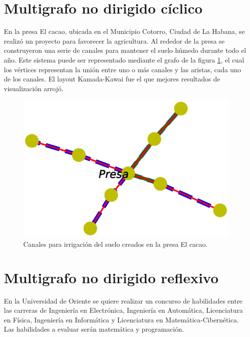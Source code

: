 \documentclass{article}
\begin{document}



\section{Multigrafo no dirigido cíclico}

En la presa El cacao, ubicada en el Municipio Cotorro, Ciudad de La Habana, se realizó un proyecto para favorecer la agricultura. Al rededor de la presa se construyeron una serie de canales para mantener el suelo húmedo durante todo el año.
Este sistema puede ser representado mediante el grafo de la figura \ref{Figura 8}, el cual los vértices representan la unión entre uno o más canales y las aristas, cada uno de los canales. El layout Kamada-Kawai fue el que mejores resultados de visualización arrojó.

\begin{figure}
  \includegraphics[width=.8\columnwidth]{fig8.eps}
  \caption{Canales para irrigación del suelo creados en la presa El cacao.}
  \label{Figura 8}
\end{figure}
\newpage



\section{Multigrafo no dirigido reflexivo}

En la Universidad de Oriente se quiere realizar un concurso de habilidades entre las carreras de Ingeniería en Electrónica, Ingeniería en Automática, Licenciatura en Física, Ingeniería en Informática y Licenciatura en Matemática-Cibernética. Las habilidades a evaluar serán matemática y programación. 
\end{document}
